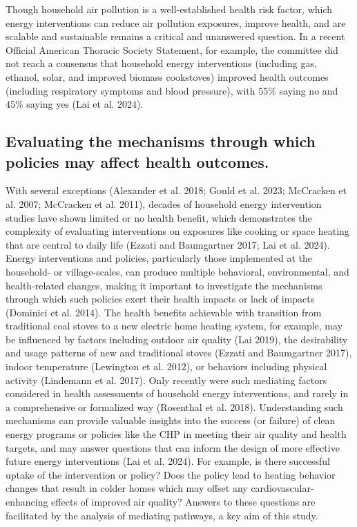\documentclass[
  letterpaper,
  DIV=11,
  numbers=noendperiod]{scrartcl}
\begin{document}
Though household air pollution is a well-established health risk factor,
which energy interventions can reduce air pollution exposures, improve
health, and are scalable and sustainable remains a critical and
unanswered question. In a recent Official American Thoracic Society
Statement, for example, the committee did not reach a consensus that
household energy interventions (including gas, ethanol, solar, and
improved biomass cookstoves) improved health outcomes (including
respiratory symptoms and blood pressure), with 55\% saying no and 45\%
saying yes (Lai et al. 2024).

\subsection{Evaluating the mechanisms through which policies may affect
health
outcomes.}\label{evaluating-the-mechanisms-through-which-policies-may-affect-health-outcomes.}

With several exceptions (Alexander et al. 2018; Gould et al. 2023;
McCracken et al. 2007; McCracken et al. 2011), decades of household
energy intervention studies have shown limited or no health benefit,
which demonstrates the complexity of evaluating interventions on
exposures like cooking or space heating that are central to daily life
(Ezzati and Baumgartner 2017; Lai et al. 2024). Energy interventions and
policies, particularly those implemented at the household- or
village-scales, can produce multiple behavioral, environmental, and
health-related changes, making it important to investigate the
mechanisms through which such policies exert their health impacts or
lack of impacts (Dominici et al. 2014). The health benefits achievable
with transition from traditional coal stoves to a new electric home
heating system, for example, may be influenced by factors including
outdoor air quality (Lai 2019), the desirability and usage patterns of
new and traditional stoves (Ezzati and Baumgartner 2017), indoor
temperature (Lewington et al. 2012), or behaviors including physical
activity (Lindemann et al. 2017). Only recently were such mediating
factors considered in health assessments of household energy
interventions, and rarely in a comprehensive or formalized way
(Rosenthal et al. 2018). Understanding such mechanisms can provide
valuable insights into the success (or failure) of clean energy programs
or policies like the CHP in meeting their air quality and health
targets, and may answer questions that can inform the design of more
effective future energy interventions (Lai et al. 2024). For example, is
there successful uptake of the intervention or policy? Does the policy
lead to heating behavior changes that result in colder homes which may
offset any cardiovascular-enhancing effects of improved air quality?
Answers to these questions are facilitated by the analysis of mediating
pathways, a key aim of this study.
\end{document}
